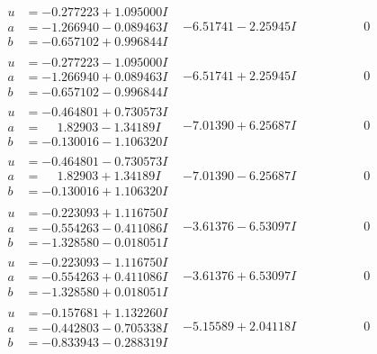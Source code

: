 \documentclass[1p]{elsarticle_modified}
\theoremstyle{definition}
\begin{document}
$$\begin{array}{c|c|c}
\begin{aligned}
u &= -0.277223 + 1.095000 I \\
a &= -1.266940 - 0.089463 I \\
b &= -0.657102 + 0.996844 I\end{aligned}
 & -6.51741 - 2.25945 I & \phantom{-0.000000 } 0 \\ \hline\begin{aligned}
u &= -0.277223 - 1.095000 I \\
a &= -1.266940 + 0.089463 I \\
b &= -0.657102 - 0.996844 I\end{aligned}
 & -6.51741 + 2.25945 I & \phantom{-0.000000 } 0 \\ \hline\begin{aligned}
u &= -0.464801 + 0.730573 I \\
a &= \phantom{-}1.82903 - 1.34189 I \\
b &= -0.130016 - 1.106320 I\end{aligned}
 & -7.01390 + 6.25687 I & \phantom{-0.000000 } 0 \\ \hline\begin{aligned}
u &= -0.464801 - 0.730573 I \\
a &= \phantom{-}1.82903 + 1.34189 I \\
b &= -0.130016 + 1.106320 I\end{aligned}
 & -7.01390 - 6.25687 I & \phantom{-0.000000 } 0 \\ \hline\begin{aligned}
u &= -0.223093 + 1.116750 I \\
a &= -0.554263 - 0.411086 I \\
b &= -1.328580 - 0.018051 I\end{aligned}
 & -3.61376 - 6.53097 I & \phantom{-0.000000 } 0 \\ \hline\begin{aligned}
u &= -0.223093 - 1.116750 I \\
a &= -0.554263 + 0.411086 I \\
b &= -1.328580 + 0.018051 I\end{aligned}
 & -3.61376 + 6.53097 I & \phantom{-0.000000 } 0 \\ \hline\begin{aligned}
u &= -0.157681 + 1.132260 I \\
a &= -0.442803 - 0.705338 I \\
b &= -0.833943 - 0.288319 I\end{aligned}
 & -5.15589 + 2.04118 I & \phantom{-0.000000 } 0 \\ \hline\begin{aligned}

\end{aligned}
\end{array}$$
\end{document}
